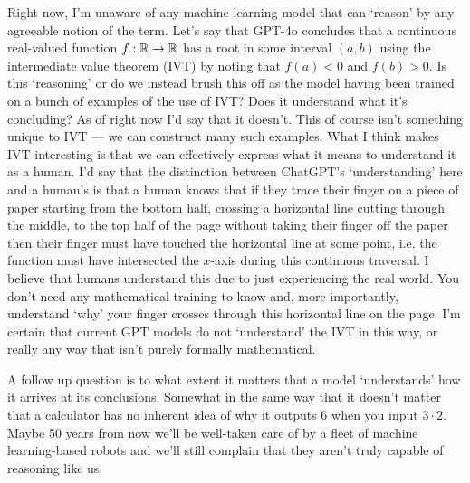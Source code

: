 \documentclass[11pt]{article}
\begin{document}
Right now, I'm unaware of any machine learning model that can `reason' by any agreeable notion of the term. Let's say that GPT-4o concludes that a continuous real-valued function $f:\mathbb{R}\rightarrow\mathbb{R}$ has a root in some interval $(a, b)$ using the intermediate value theorem (IVT) by noting that $f(a)<0$ and $f(b)>0$. Is this `reasoning' or do we instead brush this off as the model having been trained on a bunch of examples of the use of IVT? Does it understand what it's concluding? As of right now I'd say that it doesn't. This of course isn't something unique to IVT — we can construct many such examples. What I think makes IVT interesting is that we can effectively express what it means to understand it as a human. I'd say that the distinction between ChatGPT's `understanding' here and a human's is that a human knows that if they trace their finger on a piece of paper starting from the bottom half, crossing a horizontal line cutting through the middle, to the top half of the page without taking their finger off the paper then their finger must have touched the horizontal line at some point, i.e. the function must have intersected the $x$-axis during this continuous traversal. I believe that humans understand this due to just experiencing the real world. You don't need any mathematical training to know and, more importantly, understand `why' your finger crosses through this horizontal line on the page. I'm certain that current GPT models do not `understand' the IVT in this way, or really any way that isn't purely formally mathematical.

A follow up question is to what extent it matters that a model `understands' how it arrives at its conclusions. Somewhat in the same way that it doesn't matter that a calculator has no inherent idea of why it outputs 6 when you input $3\cdot2$. Maybe 50 years from now we'll be well-taken care of by a fleet of machine learning-based robots and we'll still complain that they aren't truly capable of reasoning like us.
\end{document}
